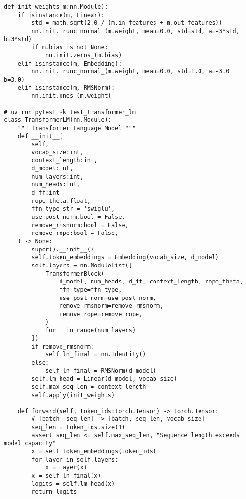 \begin{lstlisting}
def init_weights(m:nn.Module):
    if isinstance(m, Linear):
        std = math.sqrt(2.0 / (m.in_features + m.out_features))
        nn.init.trunc_normal_(m.weight, mean=0.0, std=std, a=-3*std, b=3*std)
        if m.bias is not None:
            nn.init.zeros_(m.bias)
    elif isinstance(m, Embedding):
        nn.init.trunc_normal_(m.weight, mean=0.0, std=1.0, a=-3.0, b=3.0)
    elif isinstance(m, RMSNorm):
        nn.init.ones_(m.weight)

# uv run pytest -k test_transformer_lm
class TransformerLM(nn.Module):
    """ Transformer Language Model """
    def __init__(
        self,
        vocab_size:int,
        context_length:int,
        d_model:int,
        num_layers:int,
        num_heads:int,
        d_ff:int,
        rope_theta:float,
        ffn_type:str = 'swiglu',
        use_post_norm:bool = False,
        remove_rmsnorm:bool = False,
        remove_rope:bool = False,
    ) -> None:
        super().__init__()
        self.token_embeddings = Embedding(vocab_size, d_model)
        self.layers = nn.ModuleList([
            TransformerBlock(
                d_model, num_heads, d_ff, context_length, rope_theta,
                ffn_type=ffn_type,
                use_post_norm=use_post_norm,
                remove_rmsnorm=remove_rmsnorm,
                remove_rope=remove_rope,
            )
            for _ in range(num_layers)
        ])
        if remove_rmsnorm:
            self.ln_final = nn.Identity()
        else:
            self.ln_final = RMSNorm(d_model)
        self.lm_head = Linear(d_model, vocab_size)
        self.max_seq_len = context_length
        self.apply(init_weights)
        
    def forward(self, token_ids:torch.Tensor) -> torch.Tensor:
        # [batch, seq_len] -> [batch, seq_len, vocab_size]
        seq_len = token_ids.size(1)
        assert seq_len <= self.max_seq_len, "Sequence length exceeds model capacity"
        x = self.token_embeddings(token_ids)
        for layer in self.layers:
            x = layer(x)
        x = self.ln_final(x)
        logits = self.lm_head(x)
        return logits
\end{lstlisting}


